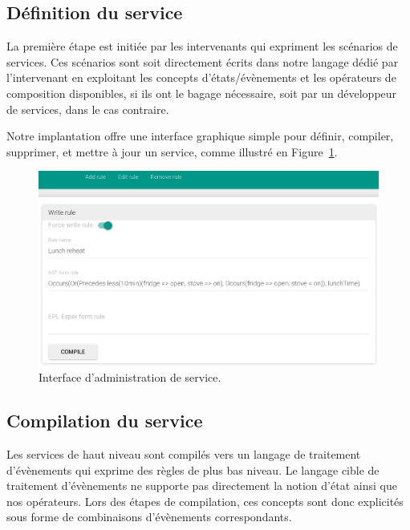 \subsection{Définition du service}
La première étape est initiée par les intervenants qui expriment les scénarios 
de services. Ces scénarios sont soit directement écrits dans notre langage dédié par 
l'intervenant en exploitant les concepts d'états/évènements et les opérateurs 
de composition disponibles, si ils ont le bagage nécessaire, soit par un 
développeur de services, dans le cas contraire.

Notre implantation offre une interface graphique simple pour définir, compiler,
supprimer, et mettre à jour un service, 
comme illustré en Figure~\ref{fig:ui_rule}.
\begin{figure}[h]
\centering
  \includegraphics[width=\linewidth,totalheight=\textheight,keepaspectratio]{gfx/ui_add_rule}
\caption{Interface d'administration de service.}
\label{fig:ui_rule}
\end{figure}

\subsection{Compilation du service}
Les services de haut niveau sont compilés vers un langage de traitement d'évènements qui exprime des règles de plus bas niveau. 
Le langage cible de traitement d'évènements ne supporte pas directement la notion d'état ainsi que nos opérateurs. Lors des étapes de compilation, ces concepts sont donc explicités sous forme de combinaisons d'évènements correspondants.

